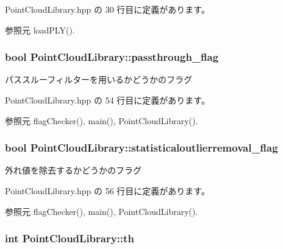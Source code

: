  Point\-Cloud\-Library.\-hpp の 30 行目に定義があります。



参照元 load\-P\-L\-Y().

\subsubsection[{passthrough\-\_\-flag}]{\setlength{\rightskip}{0pt plus 5cm}bool Point\-Cloud\-Library\-::passthrough\-\_\-flag}\label{class_point_cloud_library_a29aa3ebced9106bfc070d557efdbdbcf}


パススルーフィルターを用いるかどうかのフラグ 



 Point\-Cloud\-Library.\-hpp の 54 行目に定義があります。



参照元 flag\-Checker(), main(), Point\-Cloud\-Library().

\subsubsection[{statisticaloutlierremoval\-\_\-flag}]{\setlength{\rightskip}{0pt plus 5cm}bool Point\-Cloud\-Library\-::statisticaloutlierremoval\-\_\-flag}\label{class_point_cloud_library_a25f7509ec80771a394266cc98c117a9b}


外れ値を除去するかどうかのフラグ 



 Point\-Cloud\-Library.\-hpp の 56 行目に定義があります。



参照元 flag\-Checker(), main(), Point\-Cloud\-Library().

\subsubsection[{th}]{\setlength{\rightskip}{0pt plus 5cm}int Point\-Cloud\-Library\-::th}\label{class_point_cloud_library_a57b46fb5c545028d0dcdab0808f169fb}


